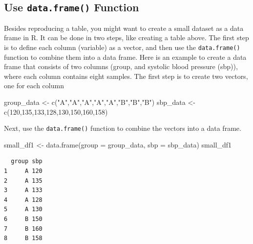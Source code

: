 \documentclass[
  letterpaper,
]{book}
\newenvironment{Shaded}{\begin{snugshade}}{\end{snugshade}}
\newcommand{\AttributeTok}[1]{\textcolor[rgb]{0.40,0.45,0.13}{#1}}
\newcommand{\DecValTok}[1]{\textcolor[rgb]{0.68,0.00,0.00}{#1}}
\newcommand{\FunctionTok}[1]{\textcolor[rgb]{0.28,0.35,0.67}{#1}}
\newcommand{\NormalTok}[1]{\textcolor[rgb]{0.00,0.23,0.31}{#1}}
\newcommand{\OtherTok}[1]{\textcolor[rgb]{0.00,0.23,0.31}{#1}}
\newcommand{\StringTok}[1]{\textcolor[rgb]{0.13,0.47,0.30}{#1}}
\begin{document}
\subsection{\texorpdfstring{Use \texttt{data.frame()}
Function}{Use data.frame() Function}}\label{use-data.frame-function}

Besides reproducing a table, you might want to create a small dataset as
a data frame in R. It can be done in two steps, like creating a table
above. The first step is to define each column (variable) as a vector,
and then use the \texttt{data.frame()} function to combine them into a
data frame. Here is an example to create a data frame that consists of
two columns (group, and systolic blood pressure (sbp)), where each
column contains eight samples. The first step is to create two vectors,
one for each column

\begin{Shaded}
\begin{Highlighting}[]
\NormalTok{group\_data }\OtherTok{\textless{}{-}} \FunctionTok{c}\NormalTok{(}\StringTok{"A"}\NormalTok{,}\StringTok{"A"}\NormalTok{,}\StringTok{"A"}\NormalTok{,}\StringTok{"A"}\NormalTok{,}\StringTok{"A"}\NormalTok{,}\StringTok{"B"}\NormalTok{,}\StringTok{"B"}\NormalTok{,}\StringTok{"B"}\NormalTok{)}
\NormalTok{sbp\_data }\OtherTok{\textless{}{-}} \FunctionTok{c}\NormalTok{(}\DecValTok{120}\NormalTok{,}\DecValTok{135}\NormalTok{,}\DecValTok{133}\NormalTok{,}\DecValTok{128}\NormalTok{,}\DecValTok{130}\NormalTok{,}\DecValTok{150}\NormalTok{,}\DecValTok{160}\NormalTok{,}\DecValTok{158}\NormalTok{)}
\end{Highlighting}
\end{Shaded}

Next, use the \texttt{data.frame()} function to combine the vectors into
a data frame.

\begin{Shaded}
\begin{Highlighting}[]
\NormalTok{small\_df1 }\OtherTok{\textless{}{-}} \FunctionTok{data.frame}\NormalTok{(}\AttributeTok{group =}\NormalTok{ group\_data,}
                       \AttributeTok{sbp =}\NormalTok{ sbp\_data)}
\NormalTok{small\_df1}
\end{Highlighting}
\end{Shaded}

\begin{verbatim}
  group sbp
1     A 120
2     A 135
3     A 133
4     A 128
5     A 130
6     B 150
7     B 160
8     B 158
\end{verbatim}
\end{document}
